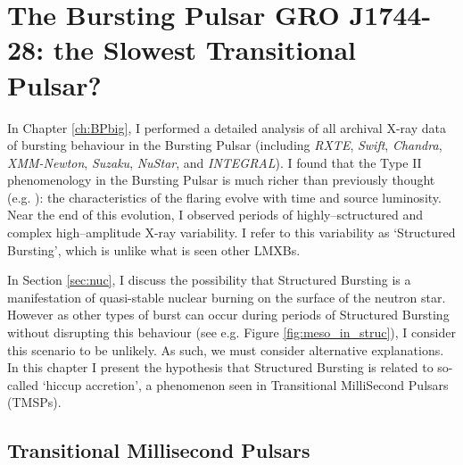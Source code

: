 \chapter{The Bursting Pulsar GRO J1744-28: the Slowest Transitional Pulsar?}

\label{ch:BPletter}

\vspace{1cm}

\par\noindent In Chapter \ref{ch:BPbig}, I performed a detailed analysis of all archival X-ray data of bursting behaviour in the Bursting Pulsar (including \textit{RXTE}, \textit{Swift}, \textit{Chandra}, \textit{XMM-Newton}, \textit{Suzaku}, \textit{NuStar}, and \textit{INTEGRAL}).  I found that the Type II phenomenology in the Bursting Pulsar is much richer than previously thought (e.g. \citealp{Giles_BP}): the characteristics of the flaring evolve with time and source luminosity. Near the end of this evolution, I observed periods of highly--sctructured and complex high--amplitude X-ray variability.  I refer to this variability as `Structured Bursting', which is unlike what is seen other LMXBs.
\par In Section \ref{sec:nuc}, I discuss the possibility that Structured Bursting is a manifestation of quasi-stable nuclear burning on the surface of the neutron star.  However as other types of burst can occur during periods of Structured Bursting without disrupting this behaviour (see e.g. Figure \ref{fig:meso_in_struc}), I consider this scenario to be unlikely.  As such, we must consider alternative explanations.  In this chapter I present the hypothesis that Structured Bursting is related to so-called `hiccup accretion', a phenomenon seen in Transitional MilliSecond Pulsars (TMSPs).

\section{Transitional Millisecond Pulsars}

